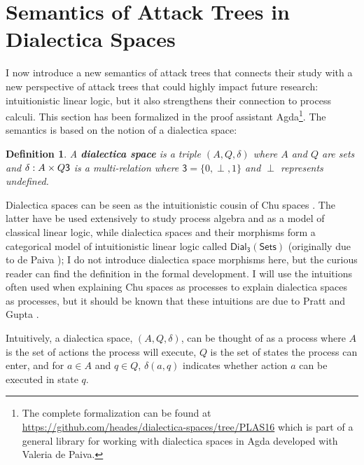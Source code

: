 \documentclass{sigplanconf}
\let\to\relax
\newcommand{\to}{\rightarrow}
\newcommand{\dial}[0]{\mathsf{Dial_3}(\mathsf{Sets})}
\newtheorem{definition}[theorem]{Definition}
\begin{document}
\section{Semantics of Attack Trees in Dialectica Spaces}
\label{sec:concrete_semantics_of_attack_trees_in_dialectica_spaces}

I now introduce a new semantics of attack trees that connects their
study with a new perspective of attack trees that could highly impact
future research: intuitionistic linear logic, but it also strengthens
their connection to process calculi.  This section has been formalized
in the proof assistant Agda\footnote{The complete formalization can be
  found at
  \url{https://github.com/heades/dialectica-spaces/tree/PLAS16}
  which is part of a general library for working with dialectica
  spaces in Agda developed with Valeria de Paiva.}.  The semantics is
based on the notion of a dialectica space:

\begin{definition}
  \label{def:dialectica-space}
  A \textbf{dialectica space} is a triple $(A, Q, \delta)$ where $A$
  and $Q$ are sets and $\delta : A \times Q \to \mathsf{3}$ is a
  multi-relation where $\mathsf{3} = \{0,\perp,1\}$ and $\perp$
  represents undefined.
\end{definition}

Dialectica spaces can be seen as the intuitionistic cousin
\cite{dePaiva:2006b} of Chu spaces \cite{Pratt:1999}.  The latter have
be used extensively to study process algebra and as a model of
classical linear logic, while dialectica spaces and their morphisms
form a categorical model of intuitionistic linear logic called $\dial$
(originally due to de Paiva \cite{dePaiva:1987}); I do not introduce
dialectica space morphisms here, but the curious reader can find the
definition in the formal development. I will use the intuitions often
used when explaining Chu spaces as processes to explain dialectica
spaces as processes, but it should be known that these intuitions are
due to Pratt and Gupta \cite{Gupta:1994}.

Intuitively, a dialectica space, $(A , Q, \delta)$, can be thought of
as a process where $A$ is the set of actions the process will execute,
$Q$ is the set of states the process can enter, and for $a \in A$ and
$q \in Q$, $\delta(a , q)$ indicates whether action $a$ can be
executed in state $q$.
\end{document}
